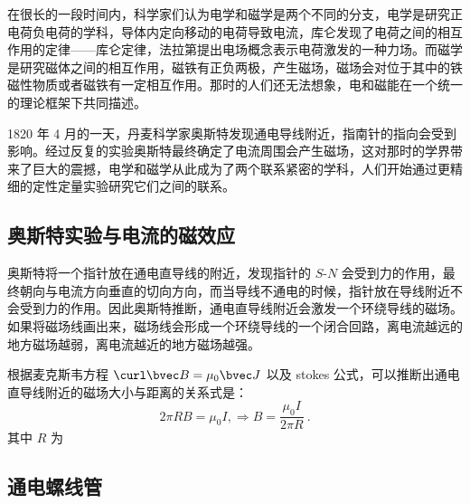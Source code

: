 

在很长的一段时间内，科学家们认为电学和磁学是两个不同的分支，电学是研究正电荷负电荷的学科，导体内定向移动的电荷导致电流，库仑发现了电荷之间的相互作用的定律——库仑定律，法拉第提出电场概念表示电荷激发的一种力场。而磁学是研究磁体之间的相互作用，磁铁有正负两极，产生磁场，磁场会对位于其中的铁磁性物质或者磁铁有一定相互作用。那时的人们还无法想象，电和磁能在一个统一的理论框架下共同描述。

1820 年 4 月的一天，丹麦科学家奥斯特发现通电导线附近，指南针的指向会受到影响。经过反复的实验奥斯特最终确定了电流周围会产生磁场，这对那时的学界带来了巨大的震撼，电学和磁学从此成为了两个联系紧密的学科，人们开始通过更精细的定性定量实验研究它们之间的联系。
\subsection{奥斯特实验与电流的磁效应}
奥斯特将一个指针放在通电直导线的附近，发现指针的 $S$-$N$ 会受到力的作用，最终朝向与电流方向垂直的切向方向，而当导线不通电的时候，指针放在导线附近不会受到力的作用。因此奥斯特推断，通电直导线附近会激发一个环绕导线的磁场。如果将磁场线画出来，磁场线会形成一个环绕导线的一个闭合回路，离电流越远的地方磁场越弱，离电流越近的地方磁场越强。

根据麦克斯韦方程 $\curl \bvec B=\mu_0 \bvec J$ 以及 stokes 公式，可以推断出通电直导线附近的磁场大小与距离的关系式是：
\begin{equation}
2\pi R B = \mu_0 I,\Rightarrow B=\frac{\mu_0 I }{2\pi R}~.
\end{equation}
其中 $R$ 为
\subsection{通电螺线管}

